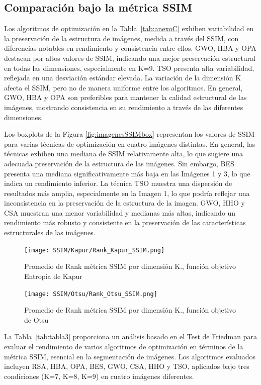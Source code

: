 \documentclass[conference]{IEEEtran}
\begin{document}
\subsection{Comparación bajo la métrica SSIM}

\noindent Los algoritmos de optimización en la Tabla~\ref{tab:anexoC} exhiben variabilidad en la preservación de la estructura de imágenes, medida a través del SSIM, con diferencias notables en rendimiento y consistencia entre ellos. GWO, HBA y OPA destacan por altos valores de SSIM, indicando una mejor preservación estructural en todas las dimensiones, especialmente en K=9. TSO presenta alta variabilidad, reflejada en una desviación estándar elevada. La variación de la dimensión K afecta el SSIM, pero no de manera uniforme entre los algoritmos. En general, GWO, HBA y OPA son preferibles para mantener la calidad estructural de las imágenes, mostrando consistencia en su rendimiento a través de las diferentes dimensiones.

\noindent Los boxplots de la Figura \ref{fig:imagenesSSIMbox} representan los valores de SSIM para varias técnicas de optimización en cuatro imágenes distintas. En general, las técnicas exhiben una mediana de SSIM relativamente alta, lo que sugiere una adecuada preservación de la estructura de las imágenes. Sin embargo, BES presenta una mediana significativamente más baja en las Imágenes 1 y 3, lo que indica un rendimiento inferior. La técnica TSO muestra una dispersión de resultados más amplia, especialmente en la Imagen 1, lo que podría reflejar una inconsistencia en la preservación de la estructura de la imagen. GWO, HHO y CSA muestran una menor variabilidad y medianas más altas, indicando un rendimiento más robusto y consistente en la preservación de las características estructurales de las imágenes.


\begin{figure}[!htb]
	\centering
	\texttt{[image: SSIM/Kapur/Rank\_Kapur\_SSIM.png]}
	\caption{Promedio de Rank métrica SSIM por dimensión K., función objetivo Entropia de Kapur}
	\label{fig:fig511}
\end{figure}

\begin{figure}[!htb]
	\centering
	\texttt{[image: SSIM/Otsu/Rank\_Otsu\_SSIM.png]}
	\caption{Promedio de Rank métrica SSIM por dimensión K., función objetivo de Otsu}
\end{figure}



\noindent La Tabla~\ref{tab:tabla3} proporciona un análisis basado en el Test de Friedman para evaluar el rendimiento de varios algoritmos de optimización en términos de la métrica SSIM, esencial en la segmentación de imágenes. Los algoritmos evaluados incluyen RSA, HBA, OPA, BES, GWO, CSA, HHO y TSO, aplicados bajo tres condiciones (K=7, K=8, K=9) en cuatro imágenes diferentes. 
\end{document}
